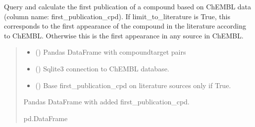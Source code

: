 \documentclass[letterpaper,10pt,english]{sphinxmanual}
\begin{document}

\begin{fulllineitems}
\label{\detokenize{add_chembl_compound_properties:add_chembl_compound_properties.add_first_publication_date}}
\pysigstartsignatures
{}
\pysigstopsignatures
\sphinxAtStartPar
Query and calculate the first publication of a compound
based on ChEMBL data (column name: first\_publication\_cpd).
If limit\_to\_literature is True, this corresponds to the first appearance
of the compound in the literature according to ChEMBL.
Otherwise this is the first appearance in any source in ChEMBL.
\begin{quote}\begin{description}
\begin{itemize}
\item {} 
\sphinxAtStartPar
{} () \textendash{} Pandas DataFrame with compound\sphinxhyphen{}target pairs

\item {} 
\sphinxAtStartPar
{} () \textendash{} Sqlite3 connection to ChEMBL database.

\item {} 
\sphinxAtStartPar
{} () \textendash{} Base first\_publication\_cpd on literature sources only if True.

\end{itemize}

\sphinxAtStartPar
Pandas DataFrame with added first\_publication\_cpd.

\sphinxAtStartPar
pd.DataFrame

\end{description}\end{quote}

\end{fulllineitems}
\end{document}
